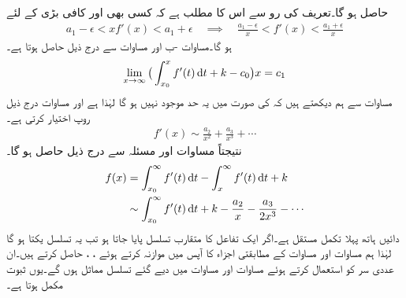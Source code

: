 حاصل ہو گا۔تعریف کی رو سے اس کا مطلب ہے کہ کسی بھی  اور کافی بڑی  کے لئے 
\begin{align}\label{مساوات_اعدادی_جزو_دو_جزو_تفرق_ج}
a_1-\epsilon<xf'(x)<a_1+\epsilon\quad \implies \quad \frac{a_1-\epsilon}{x}<f'(x)<\frac{a_1+\epsilon}{x}
\end{align}
ہو گا۔مساوات -ب اور مساوات  سے درج ذیل حاصل ہوتا ہے۔
\begin{align*}
\lim_{x\to\infty} \big(\int_{x_0}^{x} f'(t)\dif t+k-c_0\big)x=c_1
\end{align*}
مساوات  سے ہم دیکھتے ہیں کہ  کی صورت میں یہ حد موجود نہیں ہو گا لہٰذا  ہے اور مساوات  درج ذیل روپ اختیار کرتی ہے۔
\begin{align*}
f'(x)\sim \frac{a_2}{x^2}+\frac{a_3}{x^3}+\cdots
\end{align*}
نتیجتاً مساوات  اور مسئلہ  سے درج ذیل حاصل ہو گا۔
\begin{gather}
\begin{aligned}\label{مساوات_اعدادی_جزو_دو_جزو_تفرق_چ}
f(x)&=\int_{x_0}^{\infty}f'(t)\dif t-\int_{x}^{\infty}f'(t)\dif t+k\\
&\sim \int_{x_0}^{\infty} f'(t)\dif t+k-\frac{a_2}{x}-\frac{a_3}{2x^3}-\cdots
\end{aligned}
\end{gather}
دائیں ہاتھ پہلا تکمل مستقل ہے۔اگر ایک تفاعل کا متقارب تسلسل پایا جاتا ہو تب یہ تسلسل یکتا ہو گا لہٰذا ہم مساوات  اور مساوات  کے مطابقتی اجزاء کا آپس میں موازنہ کرتے ہوئے ، ،  حاصل کرتے ہیں۔ان عددی سر کو استعمال کرتے ہوئے  مساوات  اور مساوات  میں دیے گئے تسلسل مماثل ہوں گے۔یوں ثبوت مکمل ہوتا ہے۔

